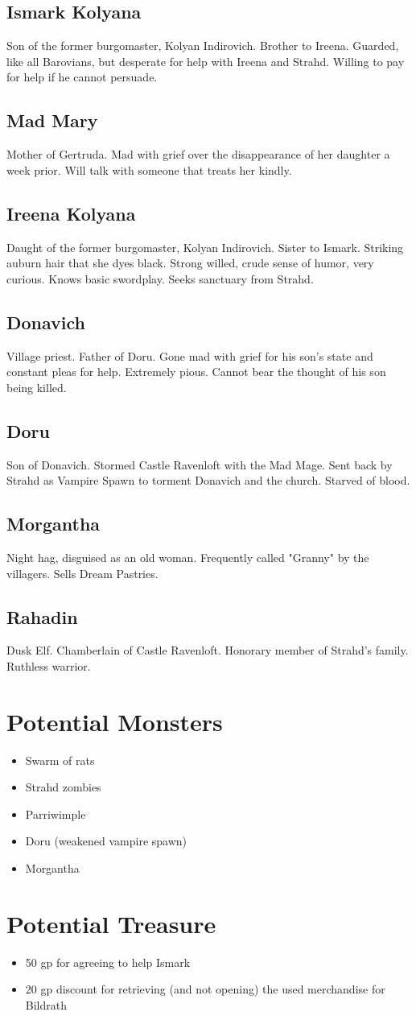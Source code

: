 \documentclass[a4paper,11pt]{article}
\begin{document}
\subsection{Ismark Kolyana}
  Son of the former burgomaster, Kolyan Indirovich. Brother to Ireena. Guarded, like all Barovians, but 
  desperate for help with Ireena and Strahd. Willing to pay for help if he cannot persuade.
\subsection{Mad Mary}
  Mother of Gertruda. Mad with grief over the disappearance of her daughter a week prior. Will talk with someone
  that treats her kindly.
\subsection{Ireena Kolyana}
  Daught of the former burgomaster, Kolyan Indirovich. Sister to Ismark. Striking auburn hair that she dyes 
  black. Strong willed, crude sense of humor, very curious. Knows basic swordplay. Seeks sanctuary from Strahd.
\subsection{Donavich}
  Village priest. Father of Doru. Gone mad with grief for his son's state and constant pleas for help. Extremely
  pious. Cannot bear the thought of his son being killed.
\subsection{Doru}
  Son of Donavich. Stormed Castle Ravenloft with the Mad Mage. Sent back by Strahd as Vampire Spawn to torment
  Donavich and the church. Starved of blood.
\subsection{Morgantha}
  Night hag, disguised as an old woman. Frequently called "Granny" by the villagers. Sells Dream Pastries.
\subsection{Rahadin}
  Dusk Elf. Chamberlain of Castle Ravenloft. Honorary member of Strahd's family. Ruthless warrior.

\pagebreak
\section{Potential Monsters}
\label{sec:PotentialMonsters}
\begin{itemize}
  \item Swarm of rats
  \item Strahd zombies
  \item Parriwimple
  \item Doru (weakened vampire spawn)
  \item Morgantha
\end{itemize}

\pagebreak
\section{Potential Treasure}
\label{sec:PotentialTreasure}
\begin{itemize}
  \item 50 gp for agreeing to help Ismark
  \item 20 gp discount for retrieving (and not opening) the used merchandise for Bildrath
\end{itemize}
\end{document}
